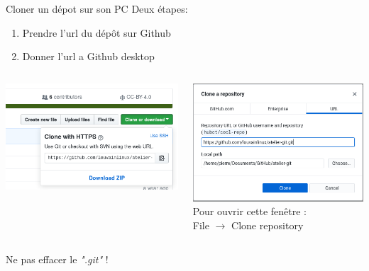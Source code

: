 \documentclass{beamer}
\begin{document}
\begin{frame}{Cloner un dépot sur son PC}
    Deux étapes:
    \begin{enumerate}
    \item Prendre l'url du dépôt sur Github
    \item Donner l'url a Github desktop
    \end{enumerate}
	\begin{columns}    
    	\begin{column}{0.5\textwidth}
    		\includegraphics[scale=0.35]{img/github_desktop/clone_repo.png}\\ $ $\\
		\end{column}
		\begin{column}{0.5\textwidth}
    		\includegraphics[scale=0.3]{img/github_desktop/clone_repo_desktop_2.png}\\
    		{\small Pour ouvrir cette fenêtre : \\File $\rightarrow$ Clone repository}
		\end{column}
	\end{columns}
	\begin{center}
		Ne pas effacer le \emph{".git"} !
	\end{center}
\end{frame}
\end{document}
